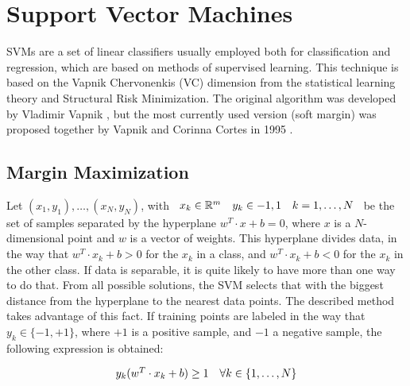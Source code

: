 
\graphicspath{{./images/chapter06/bmps/}{./images/chapter06/vects/}{./images/chapter06/}}

\chapter{Support Vector Machines}\label{ch:appendixSVM}

\acfp{SVM} are a set of linear classifiers usually employed both for classification and regression, which are based on methods of supervised learning. This technique is based on the Vapnik Chervonenkis (VC) dimension from the statistical learning theory and Structural Risk Minimization.
The original algorithm was developed by Vladimir Vapnik \citep{vapnik1998statistical}, but the most currently used version (soft margin) was proposed together by Vapnik and Corinna Cortes in 1995 \citep{cortes1995support}.

\section{Margin Maximization}\label{ch:appendixSVM_01}

Let $(x_1,y_1),\dots,(x_N,y_N)$, with $\begin{array}{l c r}  
  x_k \in \mathbb{R}^m & y_k \in {-1,1} & k=1,\dots,N 
\end{array}$ be the set of samples separated by the hyperplane $w^T \cdot x + b = 0$, where $x$ is a $N$-dimensional point and $w$ is a vector of weights. This hyperplane divides data, in the way that $w^T \cdot x_k + b > 0$ for the $x_k$ in a class, and $w^T \cdot x_k + b < 0$ for the $x_k$ in the other class. If data is separable, it is quite likely to have more than one way to do that. From all possible solutions, the \ac{SVM} selects that with the biggest distance from the hyperplane to the nearest data points. The described method takes advantage of this fact.
If training points are labeled in the way that $y_k \in \{ -1, +1\}$, where $+1$ is a positive sample, and $-1$ a negative sample, the following expression is obtained:

\begin{equation}\label{eq:appendixSVM_hyperplane_scaled}
  \begin{array}{l r}
    y_k (w^T \cdot x_k + b) \geq 1 & \forall k \in \{1, \dots, N \}
  \end{array}
\end{equation}

